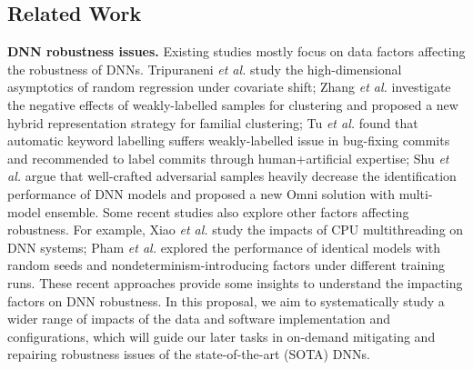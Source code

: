 \subsection{Related Work}

{\textbf{DNN robustness issues.}}
Existing studies mostly focus on data factors affecting the robustness of DNNs. Tripuraneni \textit{et al.} \cite{tripuraneni2021overparameterization} study the high-dimensional asymptotics of random regression under covariate shift; Zhang \textit{et al.} \cite{zhang2020familial} investigate the negative effects of weakly-labelled samples for clustering and proposed a new hybrid representation strategy for familial clustering; Tu \textit{et al.} \cite{tu2020better} found that automatic keyword labelling suffers weakly-labelled issue in bug-fixing commits and recommended to label commits through human+artificial expertise; Shu \textit{et al.} \cite{shu2022omni} argue that well-crafted adversarial samples heavily decrease the identification performance of DNN models and proposed a new Omni solution with multi-model ensemble. 
Some recent studies also explore other factors affecting robustness. For example, Xiao \textit{et al.} \cite{xiao2021nondeterministic} study the impacts of CPU multithreading on DNN systems; 
Pham \textit{et al.} \cite{pham2020problems} explored the performance of identical models with random seeds and nondeterminism-introducing factors under different training runs. These recent approaches provide some insights to understand the impacting factors on DNN robustness. 
In this proposal, we aim to systematically study a wider range of impacts of the data and software implementation and configurations, which will guide our later tasks in on-demand mitigating and repairing robustness issues of the state-of-the-art (SOTA) DNNs. 

